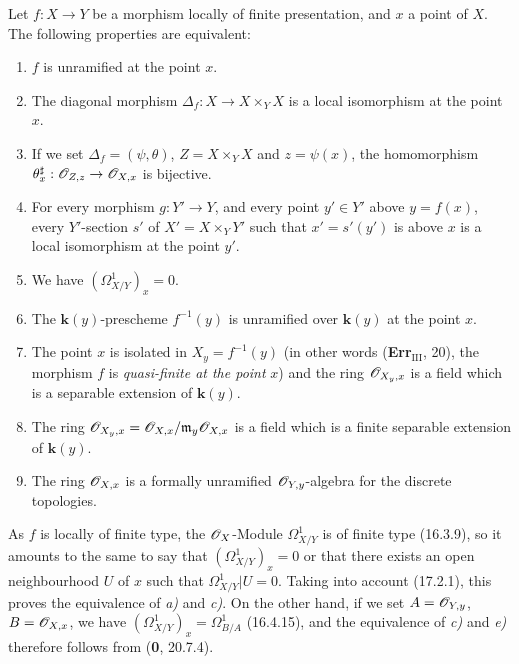 \begin{theorem}[17.4.1]
\label{IV.17.4.1}
Let $f:X\to Y$ be a morphism locally of finite presentation, and $x$ a point of $X$. The following properties are equivalent:
\begin{enumerate}
  \item[\textup{a)}] $f$ is unramified at the point $x$.
  \item[\textup{b)}] The diagonal morphism $\Delta_f:X\to X\times_Y X$ is a local isomorphism at the point $x$.
  \item[\textup{b$'$)}] If we set $\Delta_f=(\psi,\theta)$, $Z=X\times_Y X$ and $z=\psi(x)$, the homomorphism $\theta_x^\sharp:\mathscr{O}_{Z,z}\to\mathscr{O}_{X,x}$ is bijective.
  \item[\textup{b$''$)}] For every morphism $g:Y'\to Y$, and every point $y'\in Y'$ above $y=f(x)$, every $Y'$-section $s'$ of $X'=X\times_Y Y'$ such that $x'=s'(y')$ is above $x$ is a local isomorphism at the point $y'$.
  \item[\textup{c)}] We have $(\varOmega^1_{X/Y})_x=0$.
  \item[\textup{d)}] The $\boldsymbol{k}(y)$-prescheme $f^{-1}(y)$ is unramified over $\boldsymbol{k}(y)$ at the point $x$.
  \item[\textup{d$'$)}] The point $x$ is isolated in $X_y=f^{-1}(y)$ \textup{(in other words (\textbf{Err}$_{\mathrm{III}}$, 20), the morphism $f$ is \emph{quasi-finite at the point} $x$)} and the ring $\mathscr{O}_{X_y,x}$ is a field which is a separable extension of $\boldsymbol{k}(y)$.
  \item[\textup{d$''$)}] The ring $\mathscr{O}_{X_y,x}=\mathscr{O}_{X,x}/\mathfrak{m}_y\mathscr{O}_{X,x}$ is a field which is a finite separable extension of $\boldsymbol{k}(y)$.
  \item[\textup{e)}] The ring $\mathscr{O}_{X,x}$ is a formally unramified $\mathscr{O}_{Y,y}$-algebra for the discrete topologies.
\end{enumerate}
\end{theorem}

As $f$ is locally of finite type, the $\mathscr{O}_X$-Module $\varOmega^1_{X/Y}$ is of finite type (16.3.9), so it amounts to the same to say that $(\varOmega^1_{X/Y})_x=0$ or that there exists an open neighbourhood $U$ of $x$ such that $\varOmega^1_{X/Y}|U=0$. Taking into account (17.2.1), this proves the equivalence of \emph{a)} and \emph{c)}. On the other hand, if we set $A=\mathscr{O}_{Y,y}$, $B=\mathscr{O}_{X,x}$, we have $(\varOmega^1_{X/Y})_x=\Omega^1_{B/A}$ (16.4.15), and the equivalence of \emph{c)} and \emph{e)} therefore follows from (\textbf{0}, 20.7.4).

